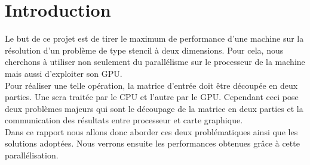 \section*{Introduction}

	Le but de ce projet est de tirer le maximum de performance d'une machine sur la résolution d'un problème de type stencil à deux dimensions. Pour cela, nous cherchons à utiliser non seulement du parallélisme sur le processeur de la machine mais aussi d'exploiter son GPU.\\
	
	Pour réaliser une telle opération, la matrice d'entrée doit \^etre découpée en deux parties. Une sera traitée par le CPU et l'autre par le GPU. Cependant ceci pose deux problèmes majeurs qui sont le découpage de la matrice en deux parties et la communication des résultats entre processeur et carte graphique.\\
	
	Dans ce rapport nous allons donc aborder ces deux problématiques ainsi que les solutions adoptées. Nous verrons ensuite les performances obtenues gr\^ace à cette parallélisation. 